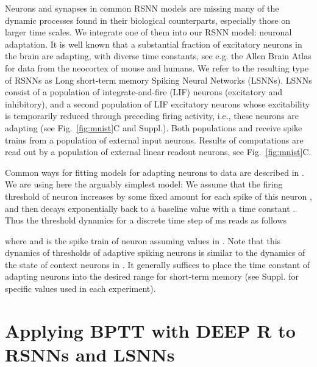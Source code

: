 \documentclass{article} \pdfoutput=1
\begin{document}
Neurons and synapses in common RSNN models are missing many of the dynamic processes found in their biological counterparts, especially those on larger time scales. We integrate one of them into our RSNN model: neuronal adaptation. It is well known that a substantial fraction of excitatory neurons in the brain are adapting, with diverse time constants, see e.g. the Allen Brain Atlas for data from the neocortex of mouse and humans. We refer to the resulting type of RSNNs as Long short-term memory Spiking Neural Networks (LSNNs).
LSNNs consist of a population  of integrate-and-fire (LIF) neurons (excitatory and inhibitory), and a second population  of LIF excitatory neurons whose excitability is temporarily reduced through preceding firing activity, i.e., these neurons are adapting (see Fig.~\ref{fig:mnist}C and Suppl.). Both populations  and  receive spike trains from a population  of external input neurons. Results of computations are read out by a population  of external linear readout neurons, see Fig.~\ref{fig:mnist}C.

Common ways for fitting models for adapting neurons to data are described in \cite{gerstner2014neuronal,pozzorini2015automated,gouwens2018systematic,teeter2018generalized}. We are using here the arguably simplest model: We assume that the firing threshold  of neuron  increases by some fixed amount  for each spike of this neuron , and then decays exponentially back to a baseline value  with a time constant . Thus the threshold dynamics for a discrete time step of  ms reads as follows

where  and  is the spike train of neuron  assuming values in .
Note that this dynamics of thresholds of adaptive spiking neurons is similar to the dynamics of the state of context neurons in \cite{mikolov2014learning}.
It generally suffices to place the time constant of adapting neurons into the desired range for short-term memory (see Suppl. for specific values used in each experiment).


\section{Applying BPTT with DEEP R to RSNNs and LSNNs}\label{sec:BPTT}
\end{document}
